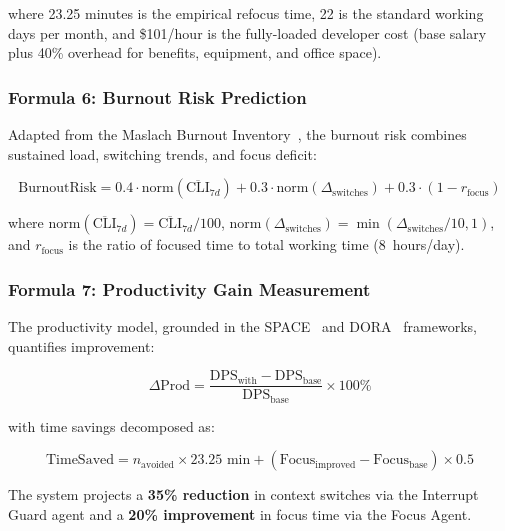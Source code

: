 \documentclass[12pt]{article}
\begin{document}
where 23.25 minutes is the empirical refocus time, 22 is the standard working days per month, and \$101/hour is the fully-loaded developer cost (base salary plus 40\% overhead for benefits, equipment, and office space).

\subsubsection{Formula 6: Burnout Risk Prediction}

Adapted from the Maslach Burnout Inventory~\cite{maslach1996maslach}, the burnout risk combines sustained load, switching trends, and focus deficit:

\begin{equation}
\text{BurnoutRisk} = 0.4 \cdot \text{norm}(\overline{\text{CLI}}_{7d}) + 0.3 \cdot \text{norm}(\Delta_{\text{switches}}) + 0.3 \cdot (1 - r_{\text{focus}})
\label{eq:burnout}
\end{equation}

where $\text{norm}(\overline{\text{CLI}}_{7d}) = \overline{\text{CLI}}_{7d}/100$, $\text{norm}(\Delta_{\text{switches}}) = \min(\Delta_{\text{switches}}/10, 1)$, and $r_{\text{focus}}$ is the ratio of focused time to total working time (8~hours/day).

\subsubsection{Formula 7: Productivity Gain Measurement}

The productivity model, grounded in the SPACE~\cite{forsgren2021space} and DORA~\cite{forsgren2018accelerate} frameworks, quantifies improvement:

\begin{equation}
\Delta\text{Prod} = \frac{\text{DPS}_{\text{with}} - \text{DPS}_{\text{base}}}{\text{DPS}_{\text{base}}} \times 100\%
\label{eq:prodgain}
\end{equation}

with time savings decomposed as:

\begin{equation}
\text{TimeSaved} = n_{\text{avoided}} \times 23.25 \text{ min} + (\text{Focus}_{\text{improved}} - \text{Focus}_{\text{base}}) \times 0.5
\label{eq:timesaved}
\end{equation}

The system projects a \textbf{35\% reduction} in context switches via the Interrupt Guard agent and a \textbf{20\% improvement} in focus time via the Focus Agent.
\end{document}
